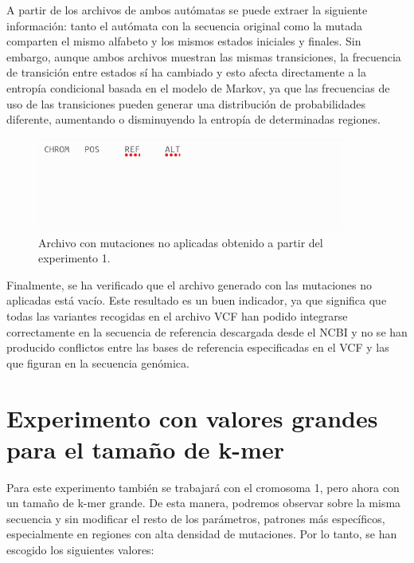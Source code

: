 \documentclass[11pt,spanish,listoffigures,listoftables]{tfgetsinf}
\begin{document}
A partir de los archivos de ambos autómatas se puede extraer la siguiente información: tanto el autómata con la secuencia original como la mutada comparten el mismo alfabeto y los mismos estados iniciales y finales. Sin embargo, aunque ambos archivos muestran las mismas transiciones, la frecuencia de transición entre estados sí ha cambiado y esto afecta directamente a la entropía condicional basada en el modelo de Markov, ya que las frecuencias de uso de las transiciones pueden generar una distribución de probabilidades diferente, aumentando o disminuyendo la entropía de determinadas regiones. 

\begin{figure}[H]
      \centering
      \includegraphics[width=0.9\textwidth]{mut_exp1.png}
      \caption{Archivo con mutaciones no aplicadas obtenido a partir del experimento 1.}
      \label{fig:etiqueta_opcional15}
\end{figure}

Finalmente, se ha verificado que el archivo generado con las mutaciones no aplicadas está vacío. Este resultado es un buen indicador, ya que significa que todas las variantes recogidas en el archivo \ac{VCF} han podido integrarse correctamente en la secuencia de referencia descargada desde el \ac{NCBI} y no se han producido conflictos entre las bases de referencia especificadas en el \ac{VCF} y las que figuran en la secuencia genómica. 


\section{Experimento con valores grandes para el tamaño de k-mer}

Para este experimento también se trabajará con el cromosoma 1, pero ahora con un tamaño de k-mer grande. De esta manera, podremos observar sobre la misma secuencia y sin modificar el resto de los parámetros, patrones más específicos, especialmente en regiones con alta densidad de mutaciones. Por lo tanto, se han escogido los siguientes valores:
\end{document}
